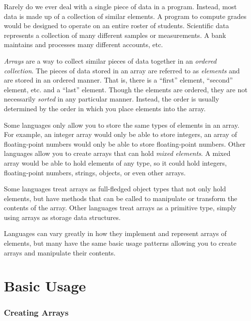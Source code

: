 

Rarely do we ever deal with a single piece of data in a program.  Instead, 
most data is made up of a collection of similar elements.  A program to
compute grades would be designed to operate on an entire roster of 
students.  Scientific data represents a collection of many different samples
or measurements. A bank maintains and processes many different accounts, etc.

\emph{Arrays} are a way to collect similar pieces of data together in an
\emph{ordered collection}.  The pieces of data stored in an array are
referred to as \emph{elements} and are stored in an ordered manner.  That is, there is 
a ``first'' element, ``second'' element, etc. and a ``last'' element.  Though
the elements are ordered, they are not necessarily \emph{sorted} in any 
particular manner.  Instead, the order is usually determined by the order
in which you place elements into the array.

Some languages only allow you to store the same types of elements in
an array.  For example, an integer array would only be able to store integers, 
an array of floating-point numbers would only be able to store floating-point
numbers.  Other languages allow you to create arrays that can hold 
\emph{mixed elements}.  A mixed array would be able to hold elements
of any type, so it could hold integers, floating-point numbers, strings, objects, 
or even other arrays.

Some languages treat arrays as full-fledged object types that  
not only hold elements, but have methods that can be called
to manipulate or transform the contents of the array.  Other languages
treat arrays as a primitive type, simply using arrays as storage
data structures.

Languages can vary greatly in how they implement and represent
arrays of elements, but many have the same basic usage patterns
allowing you to create arrays and manipulate their contents.

\section{Basic Usage}

\subsubsection{Creating Arrays}

